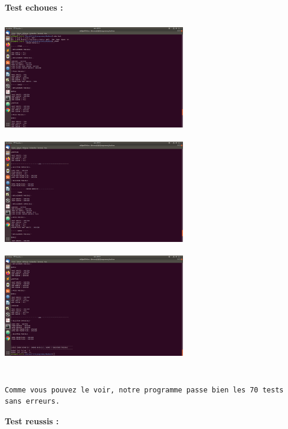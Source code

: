 \documentclass[a4paper]{article}
\begin{document}
\bigbreak
\large\bf {Test echoues :}
\bigbreak

\includegraphics[width = 8cm, height = 5cm]{TestEchoue1.png}
\includegraphics[width = 8cm, height = 5cm]{TestEchoue2.png}
\bigbreak
\includegraphics[width = 8cm, height = 5cm]{TestEchoue3.png}

\bigbreak

\begin{verbatim}

Comme vous pouvez le voir, notre programme passe bien les 70 tests sans erreurs.

\end{verbatim}

\large\bf{Test reussis : }
\bigbreak
\end{document}
